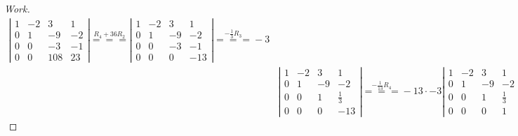\documentclass{article}
\begin{document}
\begin{proof}[Work]
\begin{align*}
        \left\lvert \begin{array}{cccc}
                        1 & -2 & 3   & 1  \\
                        0 & 1  & -9  & -2 \\
                        0 & 0  & -3  & -1 \\
                        0 & 0  & 108 & 23
                    \end{array} \right\rvert \overset{R_4 + 36R_2}{===}
        \left\lvert \begin{array}{cccc}
                        1 & -2 & 3  & 1   \\
                        0 & 1  & -9 & -2  \\
                        0 & 0  & -3 & -1  \\
                        0 & 0  & 0  & -13
                    \end{array} \right\rvert \overset{-\frac{1}{3}R_3}{===} -3               \\
         & \left\lvert \begin{array}{cccc}
                           1 & -2 & 3  & 1           \\
                           0 & 1  & -9 & -2          \\
                           0 & 0  & 1  & \frac{1}{3} \\
                           0 & 0  & 0  & -13
                       \end{array} \right\rvert \overset{-\frac{1}{13}R_4}{===} -13 \cdot -3
        \left\lvert \begin{array}{cccc}
                        1 & -2 & 3  & 1           \\
                        0 & 1  & -9 & -2          \\
                        0 & 0  & 1  & \frac{1}{3} \\
                        0 & 0  & 0  & 1
                    \end{array} \right\rvert = -13 \cdot -3 \cdot 1 = 39
    \end{align*}
\end{proof}
\qdash
\end{document}
